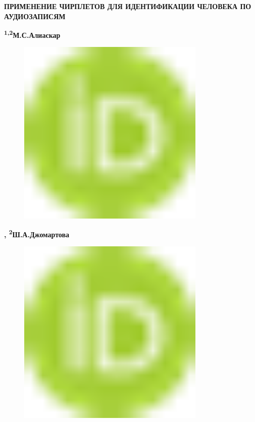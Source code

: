 
{\bfseries ПРИМЕНЕНИЕ ЧИРПЛЕТОВ ДЛЯ ИДЕНТИФИКАЦИИ ЧЕЛОВЕКА ПО АУДИОЗАПИСЯМ}

{\bfseries \textsuperscript{1,2}М.С.Алиаскар}

\begin{figure}[H]
	\centering
	\includegraphics[width=0.8\textwidth]{media/ict/image16}
	\caption*{}
\end{figure}
{\bfseries ,
\textsuperscript{2}Ш.А.Джомартова}
\begin{figure}[H]
	\centering
	\includegraphics[width=0.8\textwidth]{media/ict/image16}
	\caption*{}
\end{figure}
